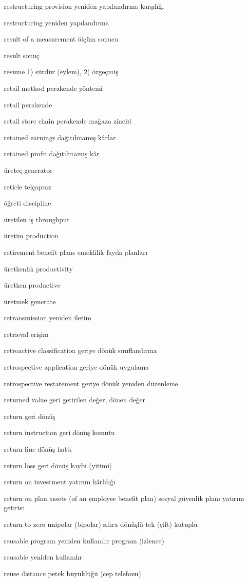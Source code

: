 \documentclass[12pt,fleqn]{article}\usepackage{../../common}
\begin{document}
restructuring provision yeniden yapılandırma karşılığı

restructuring yeniden yapılandırma

result of a measurement ölçüm sonucu

result sonuç

resume 1) sürdür (eylem), 2) özgeçmiş

retail method perakende yöntemi

retail perakende

retail store chain perakende mağaza zinciri

retained earnings dağıtılmamış kârlar

retained profit dağıtılmamış kâr

üreteç generator

reticle telçapraz

öğreti discipline

üretilen iş throughput

üretim production

retirement benefit plans emeklilik fayda planları

üretkenlik productivity

üretken productive

üretmek generate

retransmission yeniden iletim

retrieval erişim

retroactive classification geriye dönük sınıflandırma

retrospective application geriye dönük uygulama

retrospective restatement geriye dönük yeniden düzenleme 

returned value geri getirilen değer, dönen değer

return geri dönüş

return instruction geri dönüş komutu

return line dönüş hattı

return loss geri dönüş kaybı (yitimi)

return on investment yatırım kârlılığı

return on plan assets (of an employee benefit plan) sosyal güvenlik planı yatırım getirisi

return to zero unipolar (bipolar) sıfıra dönüşlü tek (çift) kutuplu

reusable program yeniden kullanılır program (izlence)

reusable yeniden kullanılır

reuse distance petek büyüklüğü (cep telefonu)
\end{document}
